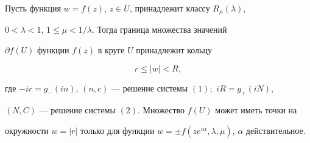  


\begin{thmnonum} 


Пусть функция $w=f(z)$, $z\in U$, принадлежит классу $R_\mu(\lambda)$, 


$0<\lambda<1$, $1\le\mu<1/\lambda$. Тогда граница множества значений 


$\partial f(U)$ функции $f(z)$ в круге $U$ принадлежит кольцу 


$$ 


r\le|w|<R, 


$$ 


где $-ir=g_-(in)$, $(n,c)$ --- решение системы $(1);$ $iR=g_+(iN)$, 


$(N,C)$ --- решение системы $(2)$. Множество $f(U)$ может иметь точки на 


окружности $w=|r|$ только для функции $w=\pm f(z 


e^{i\alpha},\lambda,\mu)$, $\alpha$ действительное. 


\end{thmnonum} 


 


